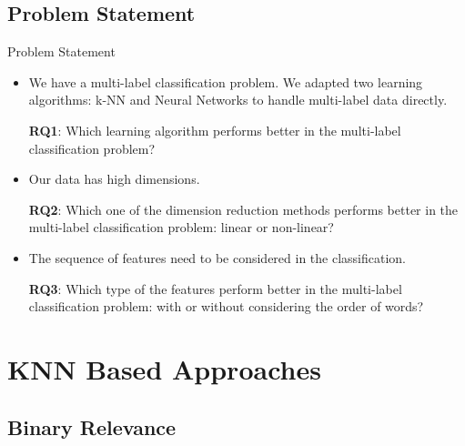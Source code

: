 \documentclass{beamer}
\begin{document}
\subsection{Problem Statement}

\begin{frame}[t]{Problem Statement}
    \small
    \begin{itemize}
        \item 
        We have a multi-label classification problem. We adapted two learning algorithms: k-NN and Neural Networks to handle multi-label data directly.
        
        \textbf{RQ1}: Which learning algorithm performs better in the multi-label classification problem? 
        
        \item
        Our data has high dimensions.
        
        \textbf{RQ2}: Which one of the dimension reduction methods performs better in the multi-label classification problem: linear or non-linear? 
        
        \item
        The sequence of features need to be considered in the classification.
        
        \textbf{RQ3}: Which type of the features perform better in the multi-label classification problem: with or without considering the order of words?
        
    \end{itemize}
    
\end{frame}

\section{KNN Based Approaches}

\subsection{Binary Relevance}
\end{document}

